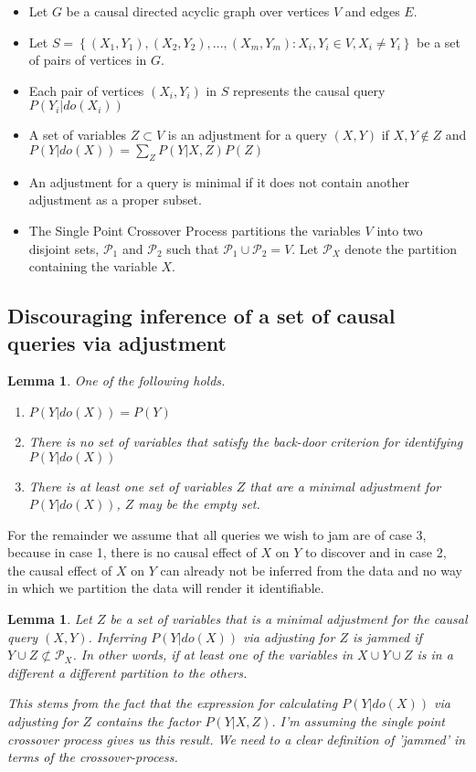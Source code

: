 \documentclass{article}
\newcommand{\set}[1]{\left\{#1\right\}}
\newcommand{\pt}{\mathcal P}
\theoremstyle{plain}
\newtheorem{lemma}[theorem]{Lemma}
\theoremstyle{definition}
\begin{document}
\begin{itemize}
\item Let $G$ be a causal directed acyclic graph over vertices $V$ and edges $E$.
\item Let $S = \set{(X_1,Y_1),(X_2,Y_2),...,(X_m,Y_m): X_i,Y_i \in V,X_i \neq Y_i}$ be a set of pairs of vertices in $G$.
\item Each pair of vertices $(X_i,Y_i)$ in $S$ represents the causal query $P(Y_i|do(X_i))$
\item A set of variables $Z \subset V$ is an adjustment for a query $(X,Y)$ if $X, Y \notin Z$ and $P(Y|do(X)) = \sum_Z P(Y|X,Z)P(Z)$
\item An adjustment for a query is minimal if it does not contain another adjustment as a proper subset.
\item The Single Point Crossover Process partitions the variables $V$ into two disjoint sets, $\pt_1$ and $\pt_2$ such that $\pt_1 \cup \pt_2 = V$. Let $\pt_X$ denote the partition containing the variable $X$.
\end{itemize}

\subsection{Discouraging inference of a set of causal queries via adjustment}

\begin{lemma}
One of the following holds.
\begin{enumerate}
\item $P(Y|do(X)) = P(Y)$
\item There is no set of variables that satisfy the back-door criterion for identifying $P(Y|do(X))$ 
\item There is at least one set of variables $Z$ that are a minimal adjustment for $P(Y|do(X))$, $Z$ may be the empty set. 
\end{enumerate}
\end{lemma}

For the remainder we assume that all queries we wish to jam are of case 3, because in case 1, there is no causal effect of $X$ on $Y$ to discover and in case 2, the causal effect of $X$ on $Y$ can already not be inferred from the data and no way in which we partition the data will render it identifiable. 


\begin{lemma}Let $Z$ be a set of variables that is a minimal adjustment for the causal query $(X,Y)$. Inferring $P(Y|do(X))$ via adjusting for $Z$ is jammed if $Y \cup Z \not\subset \pt_X$. In other words, if at least one of the variables in $X \cup Y \cup Z$ is in a different a different partition to the others. 

\color{red} This stems from the fact that the expression for calculating $P(Y|do(X))$ via adjusting for $Z$ contains the factor $P(Y|X,Z)$.  I'm assuming the single point crossover process gives us this result. We need to a clear definition of 'jammed' in terms of the crossover-process.
\end{lemma}
\end{document}
